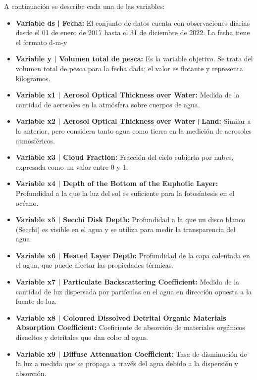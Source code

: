 \documentclass[twoside,11pt]{article}
\begin{document}
A continuación se describe cada una de las variables:
\begin{itemize}
    \item \textbf{Variable ds | Fecha:} El conjunto de datos cuenta con observaciones diarias desde el 01 de enero de 2017 hasta el 31 de diciembre de 2022. La fecha tiene el formato d-m-y
    \item \textbf{Variable y | Volumen total de pesca:} Es la variable objetivo. Se trata del volumen total de pesca para la fecha dada; el valor es flotante y representa kilogramos.
       \item \textbf{Variable x1 | Aerosol Optical Thickness over Water:}
    Medida de la cantidad de aerosoles en la atmósfera sobre cuerpos de agua.

    \item \textbf{Variable x2 | Aerosol Optical Thickness over Water+Land:}
    Similar a la anterior, pero considera tanto agua como tierra en la medición de aerosoles atmosféricos.

    \item \textbf{Variable x3 | Cloud Fraction:}
    Fracción del cielo cubierta por nubes, expresada como un valor entre 0 y 1.

    \item \textbf{Variable x4 | Depth of the Bottom of the Euphotic Layer:}
    Profundidad a la que la luz del sol es suficiente para la fotosíntesis en el océano.

    \item \textbf{Variable x5 | Secchi Disk Depth:}
    Profundidad a la que un disco blanco (Secchi) es visible en el agua y se utiliza para medir la transparencia del agua.

    \item \textbf{Variable x6 | Heated Layer Depth:}
    Profundidad de la capa calentada en el agua, que puede afectar las propiedades térmicas.

    \item \textbf{Variable x7 | Particulate Backscattering Coefficient:}
    Medida de la cantidad de luz dispersada por partículas en el agua en dirección opuesta a la fuente de luz.

    \item \textbf{Variable x8 | Coloured Dissolved Detrital Organic Materials Absorption Coefficient:}
    Coeficiente de absorción de materiales orgánicos disueltos y detritales que dan color al agua.

    \item \textbf{Variable x9 | Diffuse Attenuation Coefficient:}
    Tasa de disminución de la luz a medida que se propaga a través del agua debido a la dispersión y absorción.


\end{itemize}
\end{document}
